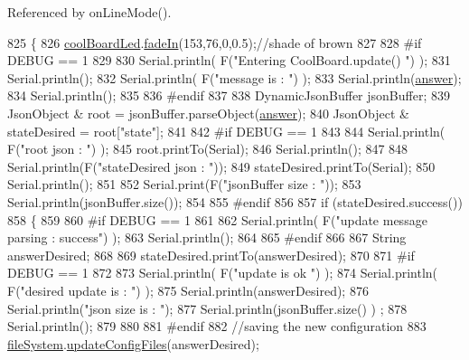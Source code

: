 Referenced by on\+Line\+Mode().


\begin{DoxyCode}
825 \{
826     \hyperlink{classCoolBoard_a1b1d3c684a5baa56b08486e192fd8e97}{coolBoardLed}.\hyperlink{classCoolBoardLed_ab778f5e7bed0ab74e3906d82110493c3}{fadeIn}(153,76,0,0.5);\textcolor{comment}{//shade of brown        }
827 
828 \textcolor{preprocessor}{#if DEBUG == 1}
829 
830     Serial.println( F(\textcolor{stringliteral}{"Entering CoolBoard.update() "}) );
831     Serial.println();
832     Serial.println( F(\textcolor{stringliteral}{"message is : "}) );
833     Serial.println(\hyperlink{classCoolBoard_a7b835fafd449e5282f7f91d787a2dc15}{answer});
834     Serial.println();
835 
836 \textcolor{preprocessor}{#endif}
837 
838     DynamicJsonBuffer jsonBuffer;
839     JsonObject & root = jsonBuffer.parseObject(\hyperlink{classCoolBoard_a7b835fafd449e5282f7f91d787a2dc15}{answer});
840     JsonObject & stateDesired = root[\textcolor{stringliteral}{"state"}];
841 
842 \textcolor{preprocessor}{#if DEBUG == 1}
843 
844     Serial.println( F(\textcolor{stringliteral}{"root json : "}) );
845     root.printTo(Serial);
846     Serial.println();
847 
848     Serial.println(F(\textcolor{stringliteral}{"stateDesired json : "}));
849     stateDesired.printTo(Serial);
850     Serial.println();
851     
852     Serial.print(F(\textcolor{stringliteral}{"jsonBuffer size : "}));
853     Serial.println(jsonBuffer.size());
854 
855 \textcolor{preprocessor}{#endif}
856 
857     \textcolor{keywordflow}{if} (stateDesired.success())
858     \{
859     
860 \textcolor{preprocessor}{    #if DEBUG == 1}
861 
862         Serial.println( F(\textcolor{stringliteral}{"update message parsing : success"}) );
863         Serial.println();
864     
865 \textcolor{preprocessor}{    #endif}
866 
867             String answerDesired;
868         
869             stateDesired.printTo(answerDesired);
870             
871 \textcolor{preprocessor}{        #if DEBUG == 1      }
872         
873             Serial.println( F(\textcolor{stringliteral}{"update is ok "}) );
874             Serial.println( F(\textcolor{stringliteral}{"desired update is : "}) );            
875             Serial.println(answerDesired);
876             Serial.println(\textcolor{stringliteral}{"json size is : "});
877             Serial.println(jsonBuffer.size() ) ;                
878             Serial.println();
879 
880         
881 \textcolor{preprocessor}{        #endif}
882             \textcolor{comment}{//saving the new configuration}
883             \hyperlink{classCoolBoard_a42c2586fbb13ff7f06538e9284e8538d}{fileSystem}.\hyperlink{classCoolFileSystem_adfa8e2e80641ae6f0cceabd348a9b841}{updateConfigFiles}(answerDesired);

\end{DoxyCode}
